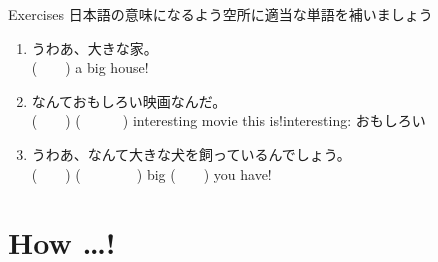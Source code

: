 \documentclass[aspectratio=169,xcolor={dvipsnames,table}]{beamer}
\begin{document}
\begin{frame}[plain]{Exercises}
日本語の意味になるよう空所に適当な単語を補いましょう
 \begin{enumerate}
  \item うわあ、大きな家。\\
	(~~~~) a big house!
  \item なんておもしろい映画なんだ。\\
	(~~~~) (~~~~~~) interesting movie this is!\hfill{\scriptsize interesting: おもしろい}
  \item うわあ、なんて大きな犬を飼っているんでしょう。\\
	(~~~~) (~~~~~~~~) big (~~~~) you have!
 \end{enumerate}
\hfill{\scriptsize {}}

\end{frame}
\section{How \ldots !}
\end{document}
